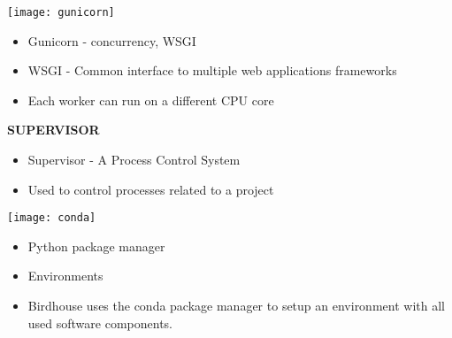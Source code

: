 \documentclass[portrait,a0paper,fontscale=0.4]{baposter} %
\newcommand{\compresslist}{%
\setlength{\itemsep}{1pt}%
\setlength{\parskip}{0pt}%
\setlength{\parsep}{0pt}%
}
\begin{document}
\begin{poster}
{\begin{multicols}{2}
\begin{minipage}{0.5\textwidth}
    \begin{minipage}{0.2\textwidth}
      \texttt{[image: gunicorn]}
    \end{minipage}
    \begin{minipage}{0.8\textwidth}
      \begin{itemize}\compresslist
        \item Gunicorn - concurrency, WSGI
        \item WSGI - Common interface to multiple web applications frameworks
        \item Each worker can run on a different CPU core
      \end{itemize}
    \end{minipage}

    \begin{minipage}{0.2\textwidth}
      {\bf SUPERVISOR}
    \end{minipage}
    \begin{minipage}{0.8\textwidth}
      \begin{itemize}\compresslist
        \item Supervisor - A Process Control System
        \item Used to control processes related to a project
      \end{itemize}
    \end{minipage}

  \end{minipage}
  \begin{minipage}{0.5\textwidth}

    \begin{minipage}{0.2\textwidth}
      \texttt{[image: conda]}
    \end{minipage}
    \begin{minipage}{0.8\textwidth}
      \begin{itemize}\compresslist
        \item Python package manager
        \item Environments
        \item Birdhouse uses the conda package manager to setup an environment with all used software components.
      \end{itemize}
    \end{minipage}


\end{minipage}
\end{multicols}}
\end{poster}
\end{document}
